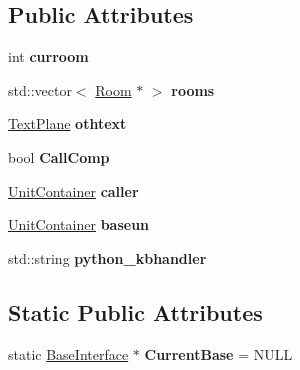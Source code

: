 \subsection*{Public Attributes}
\begin{DoxyCompactItemize}
\item 
int {\bfseries curroom}\hypertarget{classBaseInterface_ac33b060adca6c223f16e844343bc9899}{}\label{classBaseInterface_ac33b060adca6c223f16e844343bc9899}

\item 
std\+::vector$<$ \hyperlink{classBaseInterface_1_1Room}{Room} $\ast$ $>$ {\bfseries rooms}\hypertarget{classBaseInterface_ae328b79b61564e61761a9fcbb0fc02a7}{}\label{classBaseInterface_ae328b79b61564e61761a9fcbb0fc02a7}

\item 
\hyperlink{classTextPlane}{Text\+Plane} {\bfseries othtext}\hypertarget{classBaseInterface_aab9e6492e5edcdab1ccf974f6338b782}{}\label{classBaseInterface_aab9e6492e5edcdab1ccf974f6338b782}

\item 
bool {\bfseries Call\+Comp}\hypertarget{classBaseInterface_acafdf946aa1fd15825f7ec0858cc05c0}{}\label{classBaseInterface_acafdf946aa1fd15825f7ec0858cc05c0}

\item 
\hyperlink{classUnitContainer}{Unit\+Container} {\bfseries caller}\hypertarget{classBaseInterface_ac4f19a5632686c2e0abcdff219ce2ff7}{}\label{classBaseInterface_ac4f19a5632686c2e0abcdff219ce2ff7}

\item 
\hyperlink{classUnitContainer}{Unit\+Container} {\bfseries baseun}\hypertarget{classBaseInterface_ac2837f44c635a0df431d36f779e4dca3}{}\label{classBaseInterface_ac2837f44c635a0df431d36f779e4dca3}

\item 
std\+::string {\bfseries python\+\_\+kbhandler}\hypertarget{classBaseInterface_aa4cfc38aff849d46fc1682e048de2000}{}\label{classBaseInterface_aa4cfc38aff849d46fc1682e048de2000}

\end{DoxyCompactItemize}
\subsection*{Static Public Attributes}
\begin{DoxyCompactItemize}
\item 
static \hyperlink{classBaseInterface}{Base\+Interface} $\ast$ {\bfseries Current\+Base} = N\+U\+LL\hypertarget{classBaseInterface_ac2a6fbc455c5f52dd3e3e8d15b03c6e1}{}\label{classBaseInterface_ac2a6fbc455c5f52dd3e3e8d15b03c6e1}

\end{DoxyCompactItemize}
